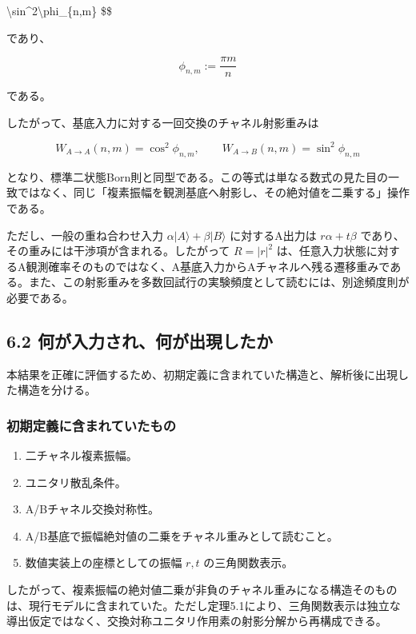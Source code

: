 \documentclass[
  a4paper,
  10pt]{article}
\providecommand{\tightlist}{%
  \setlength{\itemsep}{0pt}\setlength{\parskip}{0pt}}
\begin{document}
\textbackslash sin\^{}2\textbackslash phi\_\{n,m\} \$\$

であり、

\[
\phi_{n,m}:=\frac{\pi m}{n}
\]

である。

したがって、基底入力に対する一回交換のチャネル射影重みは

\[
\boxed{
W_{A\to A}(n,m)=\cos^2\phi_{n,m},
\qquad
W_{A\to B}(n,m)=\sin^2\phi_{n,m}
}
\]

となり、標準二状態Born則と同型である。この等式は単なる数式の見た目の一致ではなく、同じ「複素振幅を観測基底へ射影し、その絶対値を二乗する」操作である。

ただし、一般の重ね合わせ入力 \(\alpha|A\rangle+\beta|B\rangle\)
に対するA出力は \(r\alpha+t\beta\)
であり、その重みには干渉項が含まれる。したがって \(R=|r|^2\)
は、任意入力状態に対するA観測確率そのものではなく、A基底入力からAチャネルへ残る遷移重みである。また、この射影重みを多数回試行の実験頻度として読むには、別途頻度則が必要である。

\subsection{6.2
何が入力され、何が出現したか}\label{62-ux4f55ux304cux5165ux529bux3055ux308cux4f55ux304cux51faux73feux3057ux305fux304b}

本結果を正確に評価するため、初期定義に含まれていた構造と、解析後に出現した構造を分ける。

\subsubsection{初期定義に含まれていたもの}\label{ux521dux671fux5b9aux7fa9ux306bux542bux307eux308cux3066ux3044ux305fux3082ux306e}

\begin{enumerate}
\def\labelenumi{\arabic{enumi}.}
\tightlist
\item
  二チャネル複素振幅。
\item
  ユニタリ散乱条件。
\item
  A/Bチャネル交換対称性。
\item
  A/B基底で振幅絶対値の二乗をチャネル重みとして読むこと。
\item
  数値実装上の座標としての振幅 \(r,t\) の三角関数表示。
\end{enumerate}

したがって、複素振幅の絶対値二乗が非負のチャネル重みになる構造そのものは、現行モデルに含まれていた。ただし定理5.1により、三角関数表示は独立な導出仮定ではなく、交換対称ユニタリ作用素の射影分解から再構成できる。
\end{document}
